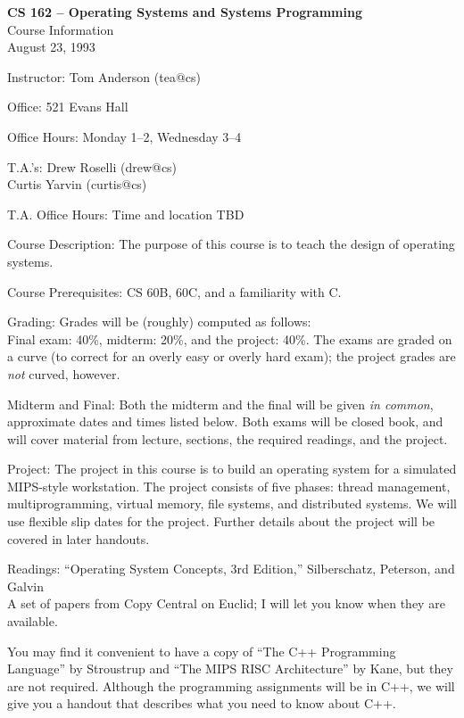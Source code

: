 

\begin{center}
\large
{\bf CS 162 -- Operating Systems and Systems Programming}\\
Course Information\\
August 23, 1993
\end{center}

\begin{description}

\item{Instructor:}  Tom Anderson (tea@cs)
\item{Office:} 521 Evans Hall
\item{Office Hours:} Monday 1--2, Wednesday 3--4

\item{T.A.'s:} Drew Roselli (drew@cs)\\
Curtis Yarvin (curtis@cs)

\item{T.A. Office Hours:} Time and location TBD

\item{Course Description:}
The purpose of this course is to teach the design of operating systems.

\item{Course Prerequisites:} CS 60B, 60C, and a familiarity with C.

\item{Grading:} Grades will be (roughly) computed as follows:\\
Final exam: 40\%, midterm: 20\%, and the project: 40\%.
The exams are graded on a curve (to correct for an overly easy or
overly hard exam); the project grades are {\em not} curved, however.

\item{Midterm and Final:} Both the midterm and the final will be given
{\em in common}, approximate dates and times listed below.
Both exams will be closed book, and will cover material from
lecture, sections, the required readings, and the project.

\item{Project:}  The project in this course is to build an operating
system for a simulated MIPS-style
workstation.  The project consists of five phases: thread management,
multiprogramming, virtual memory, file systems, and distributed systems.
We will use flexible slip dates for the project.
Further details about the project will be covered in later handouts.

\item{Readings:} ``Operating System Concepts, 3rd Edition,'' Silberschatz, Peterson, and Galvin\\
A set of papers from Copy Central on Euclid; I will let you know when they
are available.

You may find it convenient to have a copy of ``The C++ Programming
Language'' by Stroustrup and ``The MIPS RISC Architecture'' by Kane,
but they are not required.  Although the programming assignments
will be in C++, we will give you a handout that describes what
you need to know about C++.

\end{description}
\newpage

